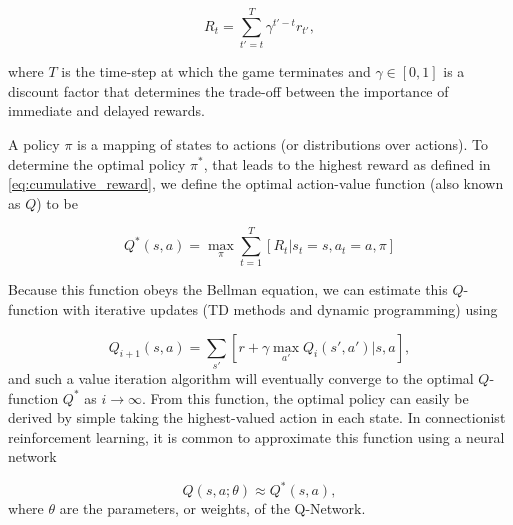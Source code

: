 \begin{equation}\label{eq:cumulative_reward}
	R_t = \sum_{t'=t}^{T} \gamma^{t'-t} r_{t'},
\end{equation}

where $T$ is the time-step at which the game terminates and $\gamma \in [0,1]$ is a discount factor that determines the trade-off between the importance of immediate and delayed rewards. 

A policy $\pi$ is a mapping of states to actions (or distributions over actions). To determine the optimal policy $\pi^*$, that leads to the highest reward as defined in \eqref{eq:cumulative_reward}, we define the optimal action-value function (also known as $Q$) to be

\begin{equation}\label{qfunction}
	Q^*(s, a) = \max_\pi \sum_{t=1}^T [R_t \vert s_t=s, a_t=a, \pi]
\end{equation}

Because this function obeys the Bellman equation, we can estimate this $Q$-function with iterative updates (TD methods and dynamic programming) using

\begin{equation}
	Q_{i+1}(s, a) = \sum_{s'} [r + \gamma \max_{a'} Q_i(s', a') \vert s, a],
\end{equation}
and such a value iteration algorithm will eventually converge to the optimal $Q$-function $Q^*$ as $i \rightarrow \infty$. From this function, the optimal policy can easily be derived by simple taking the highest-valued action in each state. In connectionist reinforcement learning, it is common to approximate this function using a neural network

\begin{equation}
	Q(s, a; \theta) \approx Q^*(s, a),
\end{equation}
where $\theta$ are the parameters, or weights, of the Q-Network.
